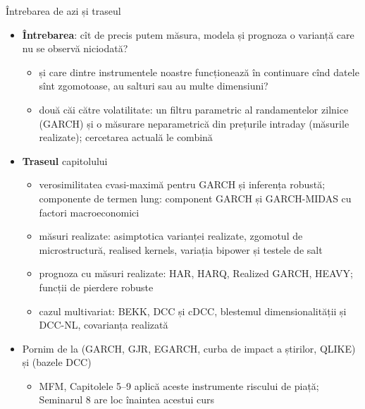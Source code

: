 \begin{frame}{Întrebarea de azi și traseul}
\itemsize{\small}
\begin{itemize}
    \item \textbf{Întrebarea}: cît de precis putem măsura, modela și prognoza o varianță care nu se observă niciodată?
    \begin{itemize}
        \item și care dintre instrumentele noastre funcționează în continuare cînd datele sînt zgomotoase, au salturi sau au multe dimensiuni?
        \item două căi către volatilitate: un filtru parametric al randamentelor zilnice (GARCH) și o măsurare neparametrică din prețurile intraday (măsurile realizate); cercetarea actuală le combină
    \end{itemize}
    \item \textbf{Traseul} capitolului
    \begin{itemize}
        \item verosimilitatea cvasi-maximă pentru GARCH și inferența robustă; componente de termen lung: component GARCH și GARCH-MIDAS cu factori macroeconomici
        \item măsuri realizate: asimptotica varianței realizate, zgomotul de microstructură, realised kernels, variația bipower și testele de salt
        \item prognoza cu măsuri realizate: HAR, HARQ, Realized GARCH, HEAVY; funcții de pierdere robuste
        \item cazul multivariat: BEKK, DCC și cDCC, blestemul dimensionalității și DCC-NL, covarianța realizată
    \end{itemize}
    \item Pornim de la  (GARCH, GJR, EGARCH, curba de impact a știrilor, QLIKE) și  (bazele DCC)
    \begin{itemize}
        \item MFM, Capitolele 5--9 aplică aceste instrumente riscului de piață; Seminarul 8 are loc înaintea acestui curs
    \end{itemize}
\end{itemize}
\end{frame}

